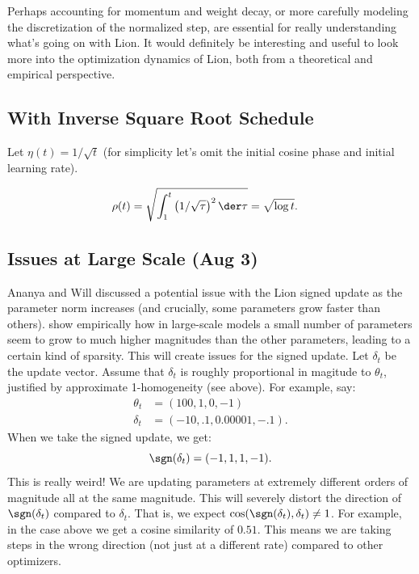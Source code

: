 \documentclass{article}
\begin{document}
Perhaps accounting for momentum and weight decay, or more carefully modeling the discretization of the normalized step, are essential for really understanding what's going on with Lion. It would definitely be interesting and useful to look more into the optimization dynamics of Lion, both from a theoretical and empirical perspective.

\subsection{With Inverse Square Root Schedule}

Let $\eta(t) = 1/\sqrt{t}$ (for simplicity let's omit the initial cosine phase and initial learning rate).

\begin{align*}
    \rho(t) 
    &= \sqrt{\int_1^t \left( 1/\sqrt{\tau} \right)^2 \der \tau} = \sqrt{\log t} .
\end{align*}

\subsection{Issues at Large Scale (Aug 3)} \label{sec:lion-issues}

Ananya and Will discussed a potential issue with the Lion signed update as the parameter norm increases (and crucially, some parameters grow faster than others). \citet{dettmers2022llmint8} show empirically how in large-scale models a small number of parameters seem to grow to much higher magnitudes than the other parameters, leading to a certain kind of sparsity. This will create issues for the signed update. Let $\delta_t$ be the update vector. Assume that $\delta_t$ is roughly proportional in magitude to $\theta_t$, justified by approximate 1-homogeneity (see above). For example, say:
\begin{align*}
    \theta_t &= (100, 1, 0, -1) \\
    \delta_t &= (-10, .1, 0.00001, -.1) .
\end{align*}
When we take the signed update, we get:
\begin{equation*}
    \sgn(\delta_t) = (-1, 1, 1, -1) .
\end{equation*}
This is really weird! We are updating parameters at extremely different orders of magnitude all at the same magnitude. This will severely distort the direction of $\sgn(\delta_t)$ compared to $\delta_t$. That is, we expect $\cos(\sgn(\delta_t), \delta_t) \neq 1$. For example, in the case above we get a cosine similarity of $0.51$. This means we are taking steps in the wrong direction (not just at a different rate) compared to other optimizers.
\end{document}
